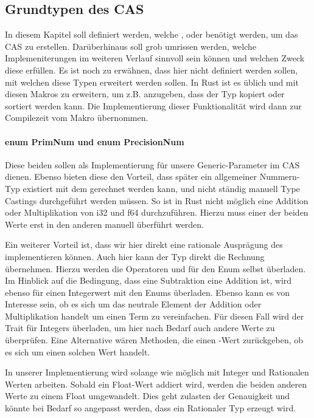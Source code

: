 \documentclass[11pt,a4paper, ngerman]{article}
\begin{document}
\subsection{Grundtypen des CAS}
In diesem Kapitel soll definiert werden, welche ,  oder  benötigt werden, um das CAS zu erstellen. Darüberhinaus soll grob umrissen werden, welche Implemeniterungen im weiteren Verlauf sinnvoll sein können und welchen Zweck diese erfüllen.
Es ist noch zu erwähnen, dass hier nicht definiert werden sollen, mit welchen  diese Typen erweitert werden sollen. In Rust ist es üblich  und  mit diesen Makros zu erweitern, um z.B. anzugeben, dass der Typ kopiert oder sortiert werden kann. Die Implementierung dieser Funktionalität wird dann zur Compilezeit vom Makro übernommen.

\paragraph{enum PrimNum und enum PrecisionNum} Diese beiden  sollen als Implementierung für unsere Generic-Parameter im CAS dienen. Ebenso bieten diese den Vorteil, dass später ein allgemeiner Nummern-Typ existiert mit dem gerechnet werden kann, und nicht ständig manuell Type Castings durchgeführt werden müssen. So ist in Rust nicht möglich eine Addition oder Multiplikation von i32 und f64 durchzuführen. Hierzu muss einer der beiden Werte erst in den anderen manuell überführt werden.

Ein weiterer Vorteil ist, dass wir hier direkt eine rationale Ausprägung des  implementieren können. Auch hier kann der Typ direkt die Rechnung übernehmen. Hierzu werden die Operatoren  und  für den Enum selbst überladen. Im Hinblick auf die Bedingung, dass eine Subtraktion eine Addition ist, wird ebenso  für einen Integerwert mit den Enums überladen. Ebenso kann es von Interesse sein, ob es sich um das neutrale Element der Addition oder Multiplikation handelt um einen Term zu vereinfachen. Für diesen Fall wird der Trait  für Integers überladen, um hier nach Bedarf auch andere Werte zu überprüfen. Eine Alternative wären Methoden, die einen -Wert zurückgeben, ob es sich um einen solchen Wert handelt.

In unserer Implementierung wird  solange wie möglich mit Integer und Rationalen Werten arbeiten. Sobald ein Float-Wert addiert wird, werden die beiden anderen Werte zu einem Float umgewandelt. Dies geht zulasten der Genauigkeit und könnte bei Bedarf so angepasst werden, dass ein Rationaler Typ erzeugt wird.
\end{document}
